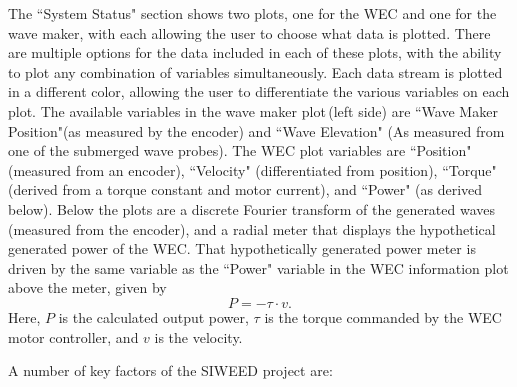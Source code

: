 \documentclass[hardware,article,submit,pdftex,moreauthors]{Definitions/mdpi}
\begin{document}
The ``System Status" section shows two plots, one for the WEC and one for the wave maker, with each allowing the user to choose what data is plotted. 
There are multiple options for the data included in each of these plots, with the ability to plot any combination of variables simultaneously.
Each data stream is plotted in a different color, allowing the user to differentiate the various variables on each plot.
The available variables in the wave maker plot\,(left side) are ``Wave Maker Position"(as measured by the encoder) and ``Wave Elevation" (As measured from one of the submerged wave probes).
The WEC plot variables are ``Position" (measured from an encoder), ``Velocity" (differentiated from position), ``Torque" (derived from a torque constant and motor current), and ``Power" (as derived below).
Below the plots are a discrete Fourier transform of the generated waves (measured from the encoder), and a radial meter that displays the hypothetical generated power of the WEC.
That hypothetically generated power meter is driven by the same variable as the ``Power" variable in the WEC information plot above the meter, given by
\begin{equation}
  P = -\tau \cdot v .
\end{equation}
Here, $P$ is the calculated output power, $\tau$ is the torque commanded by the WEC motor controller, and $v$ is the velocity.

A number of key factors of the SIWEED project are:
\end{document}

